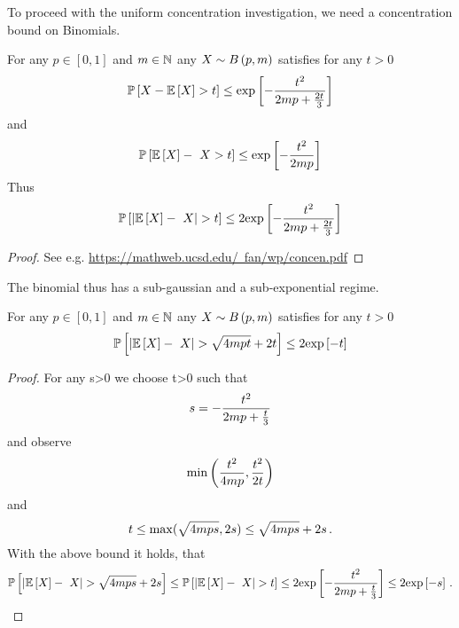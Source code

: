 To proceed with the uniform concentration investigation, we need a concentration bound on Binomials.

\begin{theorem}
	For any $p\in[0,1]$ and $m\in\mathbb{N}$ any $X \sim B\left(p,m\right)$ satisfies for any $t>0$
		\[ \mathbb{P}\left[X-\mathbb{E}\left[X\right] > t\right]  \leq \mathrm{exp}\left[- \frac{t^2}{2m p + \frac{2t}{3}} \right] \]
	and
		\[ \probof{\expectationof{X} - X > t}  \leq \expof{- \frac{t^2}{2\datanum p}} \]
	Thus
		\[ \probof{|\expectationof{X} - X| > t} \leq  2 \expof{- \frac{t^2}{2\datanum p + \frac{2t}{3}} }  \]
\end{theorem}
\begin{proof}
	See e.g.
	\href{https://mathweb.ucsd.edu/~fan/wp/concen.pdf}{https://mathweb.ucsd.edu/~fan/wp/concen.pdf}
\end{proof}

The binomial thus has a sub-gaussian and a sub-exponential regime.

\begin{theorem}
	For any $p\in[0,1]$ and $m\in\mathbb{N}$ any $X \sim B\left(p,m\right)$ satisfies for any $t>0$
		\[ \probof{|\expectationof{X} - X| > \sqrt{4\datanum p t} + 2 t} \leq  2 \expof{- t }  \]
\end{theorem}
\begin{proof}
	For any s>0 we choose t>0 such that 
		\[ s = - \frac{t^2}{2m p + \frac{t}{3}}  \]
	and observe 
		\[ \min\left( \frac{t^2}{4m p},\frac{t^2}{2t} \right) \]
	and
		\[ t \leq \max(\sqrt{4m p s},2s) \leq  \sqrt{4m p s} + 2s \, . \]
	With the above bound it holds, that
		\[  \probof{|\expectationof{X} - X| >  \sqrt{4\datanum p s} + 2s}
		\leq \probof{|\expectationof{X} - X| > t}
		\leq 2 \expof{- \frac{t^2}{2\datanum p + \frac{t}{3}} } 
		\leq 2 \expof{-s} \, . \]
\end{proof}

